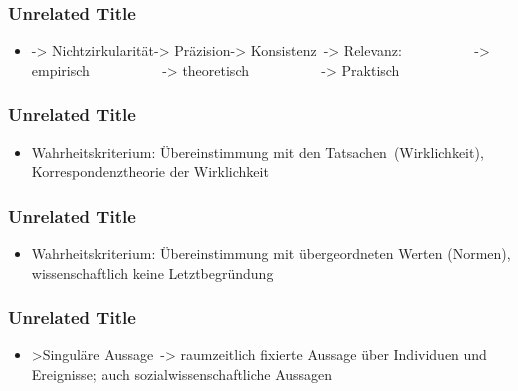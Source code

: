 \documentclass{beamer}
\begin{document}
\begin{frame}
\frametitle{Unrelated Title}


\begin{itemize}
\item -> Nichtzirkularität-> Präzision-> Konsistenz -> Relevanz:            -> empirisch            -> theoretisch            -> Praktisch  
\end{itemize}

\note[item]{}
\end{frame}
\begin{frame}
\frametitle{Unrelated Title}


\begin{itemize}
\item Wahrheitskriterium: Übereinstimmung mit den Tatsachen (Wirklichkeit), Korrespondenztheorie der Wirklichkeit 
\end{itemize}

\note[item]{}
\end{frame}
\begin{frame}
\frametitle{Unrelated Title}


\begin{itemize}
\item Wahrheitskriterium: Übereinstimmung mit übergeordneten Werten (Normen), wissenschaftlich keine Letztbegründung 
\end{itemize}

\note[item]{}
\end{frame}
\begin{frame}
\frametitle{Unrelated Title}


\begin{itemize}
\item >Singuläre Aussage -> raumzeitlich fixierte Aussage über Individuen und Ereignisse; auch sozialwissenschaftliche Aussagen 
\end{itemize}

\note[item]{}
\end{frame}
\end{document}
